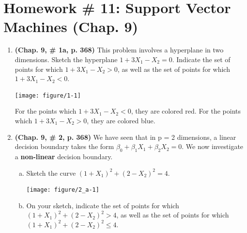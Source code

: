 \documentclass[12pt,fleqn]{article}\usepackage[]{graphicx}\usepackage[]{color}
\newenvironment{knitrout}{}{} %
\theoremstyle{definition}
\begin{document}
\rhead{\today}




\section*{Homework \# 11: Support Vector Machines (Chap. 9)}
	\begin{enumerate}[1.]
	  \item \textbf{(Chap. 9, \# 1a, p. 368)} This problem involves a hyperplane in two dimensions. Sketch the hyperplane $1+3 X_{1}-X_{2}=0$. Indicate the set of points for which $1+3 X_{1}-X_{2}>0$, as well as the set of points for which $1+3 X_{1}-X_{2}<0$.\\
\begin{knitrout}
\color{fgcolor}

{\centering \texttt{[image: figure/1-1]} 

}



\end{knitrout}
    For the points which $1+3 X_{1}-X_{2}<0$, they are colored red. For the points which $1+3 X_{1}-X_{2}>0$, they are colored blue.
    \item \textbf{(Chap. 9, \# 2, p. 368)} We have seen that in p = 2 dimensions, a linear decision boundary takes the form $\beta_{0}+\beta_{1} X_{1}+\beta_{2} X_{2}=0$. We now investigate a \textbf{non-linear} decision boundary.
        \begin{enumerate}[(a)]
          \item Sketch the curve $\left(1+X_{1}\right)^{2}+\left(2-X_{2}\right)^{2}=4$.\\
\begin{knitrout}
\color{fgcolor}

{\centering \texttt{[image: figure/2\_a-1]} 

}



\end{knitrout}

          \item On your sketch, indicate the set of points for which $\left(1+X_{1}\right)^{2}+\left(2-X_{2}\right)^{2}>4$, as well as the set of points for which $\left(1+X_{1}\right)^{2}+\left(2-X_{2}\right)^{2} \leq 4$.\\
\begin{knitrout}
\color{fgcolor}


\end{knitrout}
\end{enumerate}
\end{enumerate}
\end{document}
